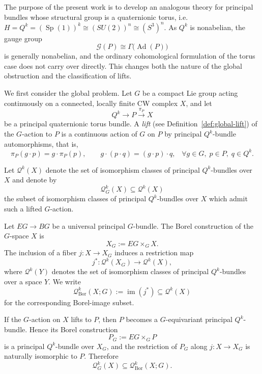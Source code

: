 \documentclass[11pt,a4paper]{article}
\numberwithin{equation}{section}
\theoremstyle{named}
\begin{document}
The purpose of the present work is to develop an analogous theory for principal bundles whose structural group is a quaternionic torus, i.e. $H=Q^k=(\operatorname{Sp}(1))^k\cong (SU(2))^n\cong (S^3)^n.$ As \(Q^k\) is nonabelian, the gauge group 
\[ 
\mathcal G(P) \cong \Gamma\bigl(\operatorname{Ad}(P)\bigr) 
\] 
is generally nonabelian, and the ordinary cohomological formulation of the torus case does not carry over directly. This changes both the nature of the global obstruction and the classification of lifts. 

We first consider the global problem. Let \(G\) be a compact Lie group acting continuously on a connected, locally finite CW complex \(X\), and let 
\[ Q^k\longrightarrow P\overset{\pi_P}{\longrightarrow}X \] 
be a principal quaternionic torus bundle. A \emph{lift} (see Definition~\ref{def:global-lift}) of the \(G\)-action to \(P\) is a continuous action of \(G\) on \(P\) by principal \(Q^k\)-bundle automorphisms, that is, 
\[ \pi_P(g\cdot p)=g\cdot\pi_P(p), \qquad g\cdot(p\cdot q)=(g\cdot p)\cdot q,\;\;\;\forall g\in G,\;p\in P,\;q\in Q^k. \] 

\noindent Let \(\mathcal Q^k(X)\) denote the set of isomorphism classes of principal \(Q^k\)-bundles over \(X\) and denote by \[ \mathcal Q^k_G(X)\subseteq \mathcal Q^k(X) \] 
the subset of isomorphism classes of principal \(Q^k\)-bundles over \(X\) which admit such a lifted \(G\)-action.

\noindent Let \(EG\to BG\) be a universal principal \(G\)-bundle. The Borel construction of the \(G\)-space \(X\) is \[ X_G:=EG\times_G X.\] 
The inclusion of a fiber $j:X\longrightarrow X_G $ induces a restriction map \[ j^*:\mathcal{Q}^k(X_G)\longrightarrow \mathcal{Q}^k(X), \] where \(\mathcal{Q}^k(Y)\) denotes the set of isomorphism classes of principal \(Q^k\)-bundles over a space \(Y\). We write \[ \mathcal Q^k_{\mathrm{Bor}}(X;G) := \operatorname{im}(j^*) \subseteq \mathcal Q^k(X) \] for the corresponding Borel-image subset. 

If the \(G\)-action on \(X\) lifts to \(P\), then \(P\) becomes a \(G\)-equivariant principal \(Q^k\)-bundle. Hence its Borel construction \[ P_G:=EG\times_G P \] is a principal \(Q^k\)-bundle over \(X_G\), and the restriction of \(P_G\) along \(j:X\to X_G\) is naturally isomorphic to \(P\). Therefore \[ \mathcal Q^k_G(X)\subseteq \mathcal Q^k_{\mathrm{Bor}}(X;G). \] 
\end{document}
